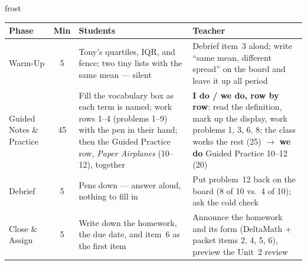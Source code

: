 \documentclass[10pt]{article}
\begin{document}
\begin{fixedskillbox}{frost}
\renewcommand{\arraystretch}{1.25}
\begin{tabularx}{\linewidth}{@{}l c X X@{}}
\textbf{Phase} & \textbf{Min} & \textbf{Students} & \textbf{Teacher} \\
\hline
Warm-Up & 5 & Tony's quartiles, IQR, and fence; two tiny lists with the same mean --- silent &
  Debrief item~3 aloud; write ``same mean, different spread'' on the board and leave it up all
  period \\
Guided Notes \& Practice & 45 & Fill the vocabulary box as each term is named; work rows 1--4
  (problems 1--9) with the pen in their hand; then the Guided Practice row, \emph{Paper
  Airplanes} (10--12), together & \textbf{I do / we do, row by row}: read the definition, mark
  up the display, work problems 1, 3, 6, 8; the class works the rest (25) $\to$ \textbf{we
  do} Guided Practice 10--12 (20) \\
Debrief & 5 & Pens down --- answer aloud, nothing to fill in & Put problem~12 back on the
  board (8 of 10 vs.\ 4 of 10); ask the cold check \\
Close \& Assign & 5 & Write down the homework, the due date, and item~6 as the first item &
  Announce the homework and its form (DeltaMath + packet items 2, 4, 5, 6), preview the Unit~2 review \\
\end{tabularx}
\end{fixedskillbox}
\end{document}
